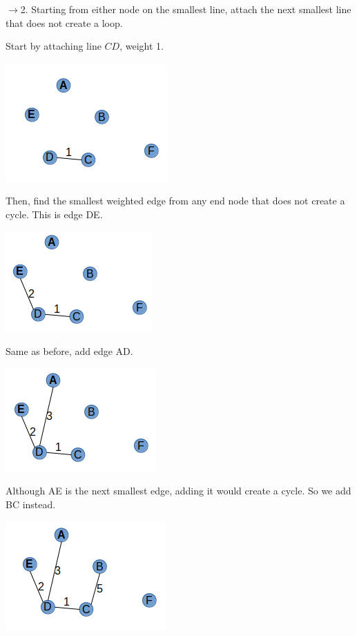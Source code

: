 \documentclass{article}
\begin{document}
$\rightarrow$2. Starting from either node on the smallest line, attach the next smallest line that does not create a loop. 

Start by attaching line $CD$, weight 1. 

\includegraphics[scale=0.5]{./P13/kruskals/1}

Then, find the smallest weighted edge from any end node that does not create a cycle. This is edge DE. 

\includegraphics[scale=0.5]{./P13/kruskals/2}

Same as before, add edge AD. 

\includegraphics[scale=0.5]{./P13/kruskals/3}

Although AE is the next smallest edge, adding it would create a cycle. So we add BC instead. 

\includegraphics[scale=0.5]{./P13/kruskals/4}
\end{document}
